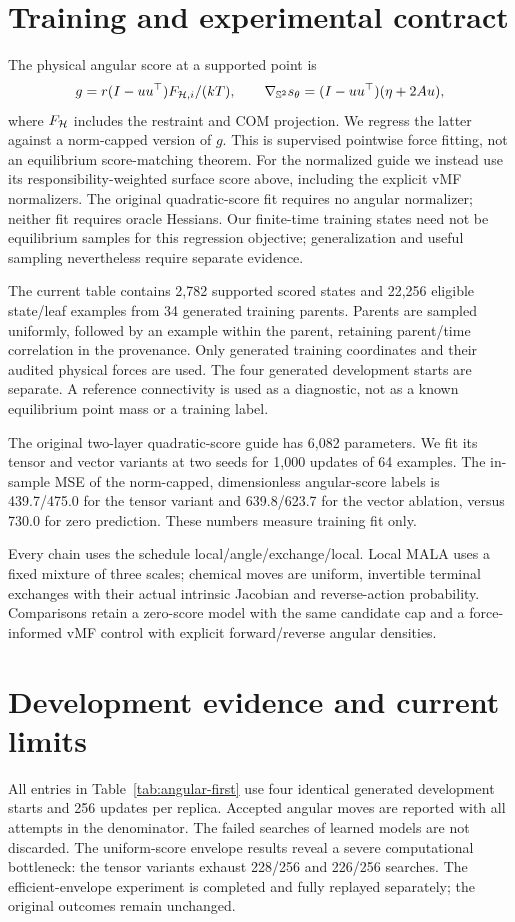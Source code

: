 \section{Training and experimental contract}
The physical angular score at a supported point is
\begin{equation}
 g=r(I-u u^\top)F_{\mathcal H,i}/(kT),\qquad
 \nabla_{\mathbb S^2}s_\theta=(I-u u^\top)(\eta+2 Au),
\end{equation}
where $F_\mathcal H$ includes the restraint and COM projection. We regress the latter
against a norm-capped version of $g$. This is supervised pointwise force fitting,
not an equilibrium score-matching theorem. For the normalized guide we instead
use its responsibility-weighted surface score above, including the explicit
vMF normalizers. The original quadratic-score fit requires no angular normalizer;
neither fit requires oracle Hessians. Our finite-time training states need not be
equilibrium samples for this regression objective; generalization and useful
sampling nevertheless require separate evidence.

The current table contains 2,782 supported scored states and 22,256 eligible
state/leaf examples from 34 generated training parents. Parents are sampled
uniformly, followed by an example within the parent, retaining parent/time
correlation in the provenance. Only generated training coordinates and their
audited physical forces are used. The four generated development starts are
separate. A reference connectivity is used as a diagnostic, not as a known
equilibrium point mass or a training label.

The original two-layer quadratic-score guide has 6,082 parameters. We fit its tensor and vector variants at
two seeds for 1,000 updates of 64 examples. The in-sample MSE of the norm-capped,
dimensionless angular-score labels is
439.7/475.0 for the tensor variant and 639.8/623.7 for the vector ablation, versus
730.0 for zero prediction. These numbers measure training fit only.

Every chain uses the schedule local/angle/exchange/local. Local MALA uses a fixed
mixture of three scales; chemical moves are uniform, invertible terminal exchanges
with their actual intrinsic Jacobian and reverse-action probability. Comparisons
retain a zero-score model with the same candidate cap and a force-informed vMF
control with explicit forward/reverse angular densities.

\section{Development evidence and current limits}
\label{sec:angular-limits}
All entries in Table~\ref{tab:angular-first} use four identical generated
development starts and 256 updates per replica. Accepted angular moves are
reported with all attempts in the denominator. The failed searches of learned
models are not discarded. The uniform-score envelope results reveal a severe
computational bottleneck: the tensor variants exhaust 228/256 and 226/256 searches.
The efficient-envelope experiment is completed and fully replayed separately;
the original outcomes remain unchanged.

